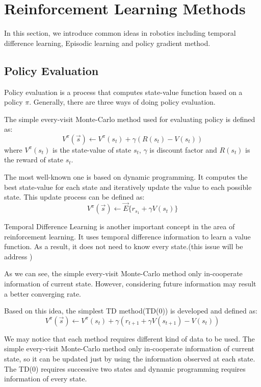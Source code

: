 \documentclass[officiallayout]{tktla}
\begin{document}
\section{Reinforcement Learning Methods}
In this section, we introduce common ideas in robotics including temporal difference learning, Episodic learning and policy gradient method.
\subsection{Policy Evaluation}
Policy evaluation is a process that computes state-value function based on a policy $\pi$. Generally, there are three ways of doing policy evaluation. 

The simple every-visit Monte-Carlo method used for evaluating policy is defined as:
\begin{equation}
V^\pi(\vec{s}) \leftarrow V^\pi(s_t) + \gamma (R(s_t) - V(s_t))
\end{equation}
where $V^\pi(s_t)$ is the state-value of state $s_t$, $\gamma$ is discount factor and $R(s_t)$ is the reward of state $s_t$. 

The most well-known one is based on dynamic programming. It computes the best state-value for each state and iteratively update the value to each possible state. This update process can be defined as:
\begin{equation}
V^\pi(\vec{s}) \leftarrow \vec{E}\{r_{s_1} + \gamma V(s_t)\}
\end{equation}

Temporal Difference Learning is another important concept in the area of reinforcement learning. It uses temporal difference information to learn a value function. As a result, it does not need to know every state.(this issue will be address )

As we can see, the simple every-visit Monte-Carlo method only in-cooperate information of current state. However, considering future information may result a better converging rate.

Based on this idea, the simplest TD method(TD(0)) is developed and defined as:
\begin{equation}
V^\pi(\vec{s}) \leftarrow V^\pi(s_t) + \gamma (r_{t+1} + \gamma V(s_{t+1})- V(s_t))
\end{equation}

We may notice that each method requires different kind of data to be used. The simple every-visit Monte-Carlo method only in-cooperate information of current state, so it can be updated just by using the information observed at each state. The TD(0) requires successive two states and dynamic programming requires information of every state.
\end{document}
